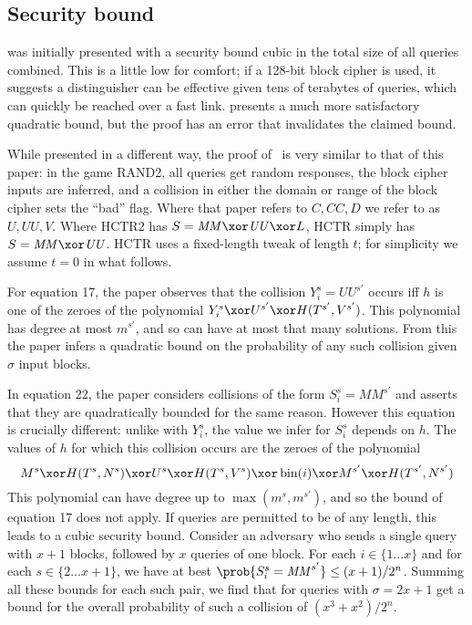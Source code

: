 \documentclass[letterpaper,11pt]{article}
\newcommand*{\MM}{\mathit{MM}}
\newcommand*{\UU}{\mathit{UU}}
\DeclareMathOperator{\fromint}{bin}
\begin{document}
\subsection{Security bound}
\cite{hctr} was initially presented with a security bound cubic
in the total size of all queries combined.  This is a little low
for comfort; if a 128-bit block cipher is used, it suggests a
distinguisher can be effective given tens of terabytes of queries,
which can quickly be reached over a fast link. 
\cite{hctrquad} presents a much more satisfactory quadratic bound,
but the proof has an error that invalidates the claimed bound.

While presented in a different way, 
the proof of~\cite{hctrquad} is very similar
to that of this paper: in the game RAND2, all queries get random
responses, the block cipher inputs are inferred, and a collision
in either the domain or range of the block cipher
sets the ``bad'' flag. Where that paper refers to 
\(C, \mathit{CC}, D\)
we refer to as \(U, \UU, V\). Where HCTR2 has
\(S = \MM \xor \UU \xor L\), HCTR simply has
\(S = \MM \xor \UU\). HCTR uses a fixed-length tweak
of length \(t\); for simplicity we assume \(t = 0\)
in what follows.

For equation 17, the paper observes that the collision
\(Y_i^s = \UU^{s'}\) occurs iff \(h\) is one of the zeroes
of the polynomial \(Y_i^s \xor U^{s'} \xor H(T^{s'}, V^{s'})\).
This polynomial has degree at most
\(m^{s'}\), and so can have
at most that many solutions. From this the paper infers
a quadratic bound on the probability of any such collision
given \(\sigma\) input blocks.

In equation 22, the paper considers collisions of the form 
\(S_i^s = \MM^{s'}\) and asserts that they are
quadratically bounded for the same reason. However this equation
is crucially different: unlike with \(Y_i^s\), the value we
infer for \(S_i^s\) depends on \(h\). The values of \(h\)
for which this collision occurs are
the zeroes of the polynomial
\begin{displaymath}
    M^s \xor H(T^s, N^s)
    \xor U^s \xor H(T^s, V^s) \xor \fromint(i) 
    \xor M^{s'} \xor H(T^{s'}, N^{s'})        
\end{displaymath}
This polynomial can have degree up to 
\(\max(m^s, m^{s'})\), and so the bound of
equation 17 does not apply.
If queries are permitted to be of any length,
this leads to a cubic security bound.
Consider an adversary who
sends a single query with \(x+1\) blocks, followed by
\(x\) queries of one block. For each \(i \in \{1\ldots x\}\) and
for each \(s \in \{2 \ldots x + 1\}\), we have at best
\(\prob{S_i^s = \MM^{s'}} \leq (x + 1)/2^n\). Summing
all these bounds for each such pair, we find that
for queries with \(\sigma = 2x + 1\)
get a bound for the overall probability of such a collision of 
\((x^3 + x^2)/2^n\).
\end{document}
